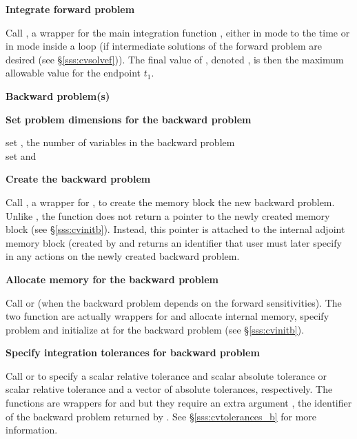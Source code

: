 \begin{Steps}
\item
  {\bf Integrate forward problem}

  Call , a wrapper for the {\cvodes} main integration
  function , either in  mode to the time 
   or in  mode inside a loop (if intermediate
  solutions of the forward problem are desired (see \S\ref{sss:cvsolvef})).
  The final value of , denoted , is then
  the maximum allowable value for the endpoint $t_1$.

  \vspace{0.2in}\centerline{\bf Backward problem(s)}

 \item \label{i:back_start}
   {\bf Set problem dimensions for the backward problem}
   
   {\s} set , the number of variables in the backward problem \\
   {\p} set  and 

\item
  {\bf Create the backward problem}

  Call , a wrapper for , to
  create the {\cvodes} memory block the new backward problem. Unlike , 
  the function  does not return a pointer to the newly created 
  memory block (see \S\ref{sss:cvinitb}). Instead, this pointer is attached to 
  the internal adjoint memory  block (created by  and returns an identifier 
  that user must later specify in any actions on the newly created 
  backward problem.

\item
  {\bf Allocate memory for the backward problem}

  Call  or  (when the backward problem depends on the
  forward sensitivities). The two function are actually wrappers for  
  and allocate internal memory, specify problem and initialize {\cvodes} 
  at  for the backward problem (see \S\ref{sss:cvinitb}).

\item 
  {\bf Specify integration tolerances for backward problem}
  
  Call  or 
  to specify a scalar relative tolerance and scalar absolute tolerance or
  scalar relative tolerance and a vector of absolute tolerances, respectively.
  The functions are wrappers for  and
   but they require an extra argument ,
  the identifier of the backward problem returned by .
  See \S\ref{sss:cvtolerances_b} for more information.



\end{Steps}
